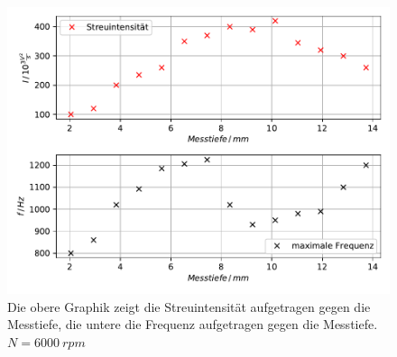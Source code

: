 \begin{figure}
    \centering
    \includegraphics[width=\textwidth]{content/data/depth_6000.pdf}
    \caption{Die obere Graphik zeigt die Streuintensität aufgetragen gegen die Messtiefe, die untere die Frequenz aufgetragen gegen die Messtiefe. $N=\SI{6000}{rpm}$}
    \label{fig:6000}
\end{figure}
